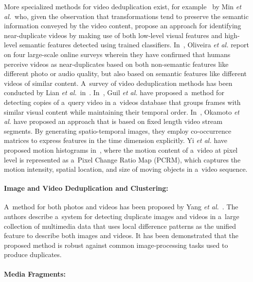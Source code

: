 More specialized methods for video deduplication exist,
for example~\cite{min2011nearduplicatevideo,wu2009nearduplicate}
by Min \emph{et al.}\ who, given the observation that 
transformations tend to preserve the semantic information conveyed
by the video content, propose an approach for identifying
near-duplicate videos by making use of both low-level visual
features and high-level semantic features
detected using trained classifiers.
In~\cite{oliveira2010nearduplicate}, Oliveira
\emph{et al.} report on four large-scale online surveys
wherein they have confirmed that humans perceive videos as near-duplicates
based on both non-semantic features like different photo or audio
quality, but also based on semantic features like different
videos of similar content.
A~survey of video deduplication methods has been conducted by
Lian \emph{et al.}\ in~\cite{lian2010survey}.
In~\cite{guil2007clustering}, Guil \emph{et al.} have proposed a~method
for detecting copies of a~query video in a~videos database
that groups frames with similar visual content while maintaining their temporal order.
In~\cite{okamoto2002videoclustering}, Okamoto \emph{et al.} have proposed an approach
that is based on fixed length video stream segments.
By generating spatio-temporal images, they employ co-occurrence matrices
to express features in the time dimension explicitly. 
Yi \emph{et al.} have proposed motion histograms in~\cite{yi2005motionhistogram},
where the motion content of a~video at pixel level is represented
as a~Pixel Change Ratio Map (PCRM), which captures the motion intensity,
spatial location, and size of moving objects in a~video sequence. 

\paragraph{Image and Video Deduplication and Clustering:}

A~method for both photos and videos
has been proposed by Yang \emph{et al.}~\cite{yang2009nearduplicate}.
The authors describe a~system for detecting duplicate images and videos
in a~large collection of multimedia data that uses local difference patterns
as the unified feature to describe both images and videos.
It has been demonstrated that the proposed method is robust against
common image-processing tasks used to produce duplicates.

\paragraph{Media Fragments:}

